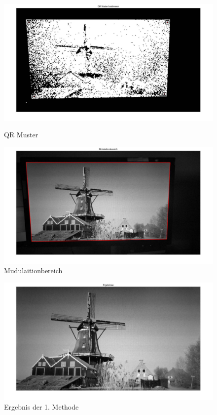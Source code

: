\begin{figure}[H]
\centering 
\begin{minipage}[b]{0.49\textwidth} 
\centering 
\includegraphics[width=1.0\textwidth]{images/5_Implementirung/QR_muster.pdf} 
\caption{QR Muster}
\label{fig:QR_muster}
\end{minipage}
\begin{minipage}[b]{0.49\textwidth} 
\centering 
\includegraphics[width=1.0\textwidth]{images/5_Implementirung/Mudulaition.pdf}
\caption{Mudulaitionbereich}
\label{fig:Mudulaitionbereich}
\end{minipage}
\end{figure}

\begin{figure}[H]
 \centering 
  \includegraphics[keepaspectratio,width=1.0\textwidth]{images/5_Implementirung/ergeb.pdf}
 \caption{Ergebnis der 1. Methode}
 \label{fig:Ergebnis1}
\end{figure}

